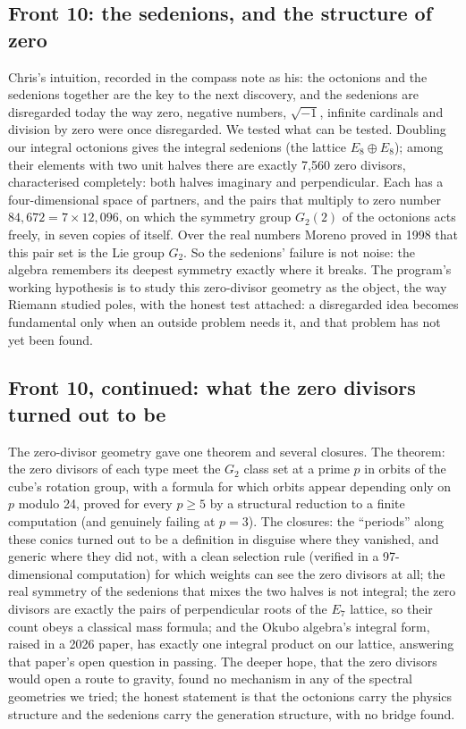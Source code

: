\documentclass[11pt]{article}
\begin{document}
\subsection{Front 10: the sedenions, and the structure of zero}
Chris's intuition, recorded in the compass note as his: the octonions and the sedenions together are the key to the next discovery, and the sedenions are disregarded today the way zero, negative numbers, $\sqrt{-1}$, infinite cardinals and division by zero were once disregarded. We tested what can be tested. Doubling our integral octonions gives the integral sedenions (the lattice $E_8\oplus E_8$); among their elements with two unit halves there are exactly 7{,}560 zero divisors, characterised completely: both halves imaginary and perpendicular. Each has a four-dimensional space of partners, and the pairs that multiply to zero number $84{,}672 = 7\times12{,}096$, on which the symmetry group $G_2(2)$ of the octonions acts freely, in seven copies of itself. Over the real numbers Moreno proved in 1998 that this pair set is the Lie group $G_2$. So the sedenions' failure is not noise: the algebra remembers its deepest symmetry exactly where it breaks. The program's working hypothesis is to study this zero-divisor geometry as the object, the way Riemann studied poles, with the honest test attached: a disregarded idea becomes fundamental only when an outside problem needs it, and that problem has not yet been found.

\subsection{Front 10, continued: what the zero divisors turned out to be}
The zero-divisor geometry gave one theorem and several closures. The theorem: the zero divisors of each type meet the $G_2$ class set at a prime $p$ in orbits of the cube's rotation group, with a formula for which orbits appear depending only on $p$ modulo 24, proved for every $p\ge5$ by a structural reduction to a finite computation (and genuinely failing at $p=3$). The closures: the ``periods'' along these conics turned out to be a definition in disguise where they vanished, and generic where they did not, with a clean selection rule (verified in a 97-dimensional computation) for which weights can see the zero divisors at all; the real symmetry of the sedenions that mixes the two halves is not integral; the zero divisors are exactly the pairs of perpendicular roots of the $E_7$ lattice, so their count obeys a classical mass formula; and the Okubo algebra's integral form, raised in a 2026 paper, has exactly one integral product on our lattice, answering that paper's open question in passing. The deeper hope, that the zero divisors would open a route to gravity, found no mechanism in any of the spectral geometries we tried; the honest statement is that the octonions carry the physics structure and the sedenions carry the generation structure, with no bridge found.
\end{document}
